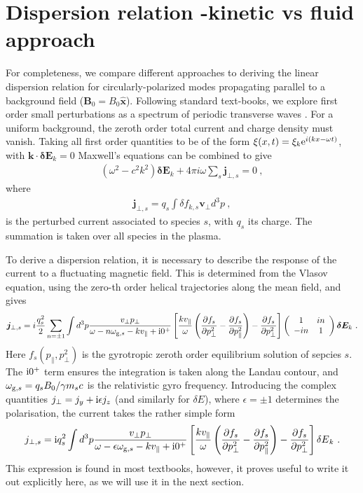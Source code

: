 \documentclass[a4paper,fleqn,usenatbib]{mnras}
\newcommand{\eqb}{\begin{eqnarray}}
\newcommand{\eqe}{\end{eqnarray}}
\begin{document}

\onecolumn 
\appendix

{
\section{Dispersion relation -kinetic  vs fluid approach}
}
For completeness, we compare different approaches to deriving the linear dispersion relation
for circularly-polarized modes propagating parallel to a background field ($\bm{B}_0= B_0 \bm{\hat{x}}$). Following standard text-books, we explore first order small perturbations as a spectrum of periodic transverse waves \cite[e.g.][]{Ichimaru,KrallTrivelpiece}. For a uniform background, the zeroth order total current and charge density must vanish.  
Taking all first order quantities to be of the form $\xi(x,t) = \xi_k {\rm e}^{i(k x-\omega t)}$, with $\bm{k\cdot \delta E}_k = 0$ Maxwell's equations can be combined to give
\eqb
\label{EqA1}
(\omega^2 - c^2k^2) \bm{\delta E}_k + 4 \pi i \omega \sum_s \bm{j}_{\bot,s} = 0 ~,
\eqe
where 
\eqb
\bm{j}_{\bot,s} = q_s\int \delta f_{k,s} \bm {v}_\bot d^3 p~,
\eqe
is the perturbed current associated to species $s$, with
$q_s$ its charge. The summation is taken over all species in the plasma.
 
To derive a dispersion relation, it is necessary to describe the response of the current to a fluctuating magnetic field. This is determined from the Vlasov equation, using the zero-th order helical trajectories along the mean field\cite[see for example][chapter 8]{KrallTrivelpiece}, and gives
\eqb
\bm{j}_{\bot,s} =
i\frac{q_s^2}{2} \sum_{n=\pm 1} \int d^3 p
\frac{v_\bot p_\bot}{\omega  - n \omega_{{\rm g},s} -k v_\| +{\rm i}0^+}
\left[ 
\frac{ k v_\|}{\omega}\left(\frac{\partial f_s}{\partial p_\bot^2}-\frac{\partial f_s}{\partial p_\|^2}\right) -\frac{\partial f_s}{\partial p_\bot^2} \right] 
\left(\begin{array}{cc}
1 & i n \\ -i n & 1
\end{array}\right) \bm{\delta E}_k~.
\eqe
Here $f_s(p_\|,p_\bot^2)$ is the gyrotropic zeroth order equilibrium solution of sepcies $s$. The ${\rm i}0^+$ term ensures the integration is taken along the Landau contour, and $\omega_{{\rm g},s}=q_sB_0/\gamma m_s c$ is the relativistic gyro frequency.
Introducing the complex quantities $j_\bot = j_y +{\rm i} \epsilon j_z$ (and similarly for $\delta E$), where $\epsilon = \pm1$ determines the polarisation, the current takes the rather simple form
\eqb
j_{\bot,s} =
{\rm i} {q_s^2} \int d^3 p
\frac{v_\bot p_\bot}{\omega  -  \epsilon \omega_{{\rm g},s} -k v_\| +{\rm i}0^+}
\left[ 
\frac{ k v_\|}{\omega}\left(\frac{\partial f_s}{\partial p_\bot^2}-\frac{\partial f_s}{\partial p_\|^2}\right) -\frac{\partial f_s}{\partial p_\bot^2} \right] 
{\delta E}_k~.
\label{jbot}
\eqe 
This expression is found in most textbooks, however, it proves useful to write it out explicitly here, as we will use it in the next section.
\end{document}
